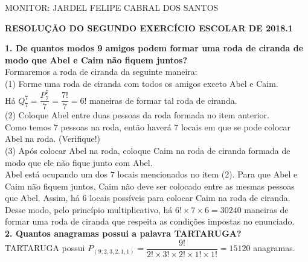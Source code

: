 \documentclass[12pt, a4paper]{article}
\begin{document}
\begin{flushleft}

MONITOR: JARDEL FELIPE CABRAL DOS SANTOS\\[1cm] 
\end{flushleft}

\begin{center} \textbf{RESOLUÇÃO DO SEGUNDO EXERCÍCIO ESCOLAR DE 2018.1\\[1cm]}
\end{center}

\textbf{1. De quantos modos 9 amigos podem formar uma roda de ciranda de modo que Abel e Caim não fiquem juntos?} \\
 
Formaremos a roda de ciranda da seguinte maneira: \\

(1) Forme uma roda de ciranda com todos os amigos exceto Abel e Caim. \\

Há \(Q^{7}_{7} = \dfrac{P^{7}_7}{7} = \dfrac{7!}{7} = 6!\) maneiras de formar tal roda de ciranda. \\

(2) Coloque Abel entre duas pessoas da roda formada no item anterior. \\

Como temos \(7\) pessoas na roda, então haverá \(7\) locais em que se pode colocar Abel na roda. (Verifique!) \\

(3) Após colocar Abel na roda, coloque Caim na roda de ciranda formada de modo que ele não fique junto com Abel.  \\ 

Abel está ocupando um dos \(7\) locais mencionados no item (2). Para que Abel e Caim não fiquem juntos, Caim não deve ser colocado entre as mesmas pessoas que Abel. Assim, há \(6\) locais possíveis para colocar Caim na roda de ciranda. \\

Desse modo, pelo princípio multiplicativo, há \(6! \times 7 \times 6 = 30240\) maneiras de formar uma roda de ciranda que respeita as condições impostas no enunciado. \\

\textbf{2. Quantos anagramas possui a palavra TARTARUGA?} \\

TARTARUGA possui \(P_{(9; 2, 3, 2, 1, 1)}=\dfrac{9!}{2! \times 3! \times 2! \times 1! \times 1!} = 15120\) anagramas. \\
\end{document}
